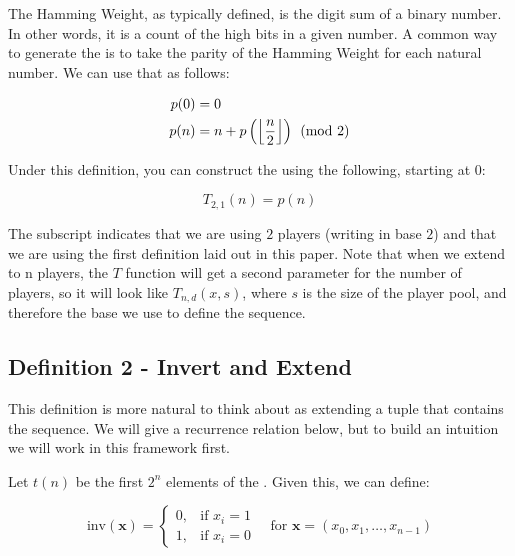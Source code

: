 \documentclass[conference]{IEEEtran}
\begin{document}
The Hamming Weight, as typically defined, is the digit sum of a binary number. In other words, it is a count of the high bits in a given number. A common way to generate the \TMS is to take the parity of the Hamming Weight for each natural number. We can use that as follows:

\begin{equation}
    \begin{aligned}
        p(0) &= 0 \\
        p(n) &= n + p\left(\left\lfloor \dfrac{n}{2} \right\rfloor\right) \pmod{2}
    \end{aligned}
\end{equation}

Under this definition, you can construct the \TMS using the following, starting at $0$:

\begin{equation}
    \label{eq:p2d01}
    T_{2,1}(n) = p(n)
\end{equation}

The subscript indicates that we are using $2$ players (writing in base $2$) and that we are using the first definition laid out in this paper. Note that when we extend to n players, the $T$ function will get a second parameter for the number of players, so it will look like $T_{n,d}(x, s)$, where $s$ is the size of the player pool, and therefore the base we use to define the sequence.

\subsection{Definition 2 - Invert and Extend}


This definition is more natural to think about as extending a tuple that contains the sequence. We will give a recurrence relation below, but to build an intuition we will work in this framework first.

Let $t(n)$ be the first $2^n$ elements of the \TMS. Given this, we can define:

\begin{equation}
    \text{inv}(\mathbf{x}) = \begin{cases}
        0, & \text{if } x_i = 1 \\
        1, & \text{if } x_i = 0
    \end{cases} \quad \text{for } \mathbf{x} = (x_0, x_1, \ldots, x_{n-1})
\end{equation}
\end{document}
